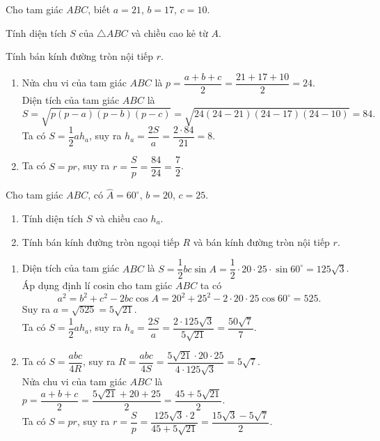 \begin{vd}%
	Cho tam giác $ABC$, biết $a=21$, $b=17$, $c=10$.
	\begin{listEX}[1]
		\item Tính diện tích $S$ của $\triangle ABC$ và chiều cao kẻ từ $A$.
		\item Tính bán kính đường tròn nội tiếp $r$.
	\end{listEX}
	\loigiai
	{
	\begin{enumerate}
		\item Nửa chu vi của tam giác $ABC$ là $p=\dfrac{a+b+c}{2} = \dfrac{21+17+10}{2} = 24$.\\
		Diện tích của tam giác $ABC$ là
		\[S=\sqrt{p(p-a)(p-b)(p-c)} = \sqrt{24(24-21)(24-17)(24-10)} = 84.\]
		Ta có $S=\dfrac{1}{2}ah_a$, suy ra $h_a=\dfrac{2S}{a} = \dfrac{2\cdot 84}{21}=8$.
		\item Ta có $S=pr$, suy ra $r=\dfrac{S}{p} = \dfrac{84}{24}=\dfrac{7}{2}$.
	\end{enumerate}
	}
\end{vd}
\begin{vd}%
	Cho tam giác $ABC$, có $\widehat{A}=60^\circ$, $b=20$, $c=25$.
	\begin{enumerate}
		\item Tính diện tích $S$ và chiều cao $h_a$.
		\item Tính bán kính đường tròn ngoại tiếp $R$ và bán kính đường tròn nội tiếp $r$.
	\end{enumerate}
	\loigiai
	{
	\begin{enumerate}
		\item Diện tích của tam giác $ABC$ là $S=\dfrac{1}{2}bc\sin A = \dfrac{1}{2}\cdot 20\cdot 25\cdot \sin 60^\circ = 125\sqrt{3}$.\\
		Áp dụng định lí cosin cho tam giác $ABC$ ta có
		\[a^2=b^2+c^2-2bc\cos A = 20^2+25^2-2\cdot 20\cdot 25\cos 60^\circ = 525.\]
		Suy ra $a=\sqrt{525}=5\sqrt{21}$.\\
		Ta có $S=\dfrac{1}{2}ah_a$, suy ra $h_a=\dfrac{2S}{a} = \dfrac{2\cdot 125\sqrt{3}}{5\sqrt{21}} = \dfrac{50\sqrt{7}}{7}$.
		\item Ta có $S=\dfrac{abc}{4R}$, suy ra $R=\dfrac{abc}{4S} = \dfrac{5\sqrt{21}\cdot 20\cdot 25}{4\cdot 125\sqrt{3}} = 5\sqrt{7}$.\\
		Nửa chu vi của tam giác $ABC$ là $p=\dfrac{a+b+c}{2} = \dfrac{5\sqrt{21}+20+25}{2} = \dfrac{45+5\sqrt{21}}{2}$.\\
		Ta có $S=pr$, suy ra $r=\dfrac{S}{p} = \dfrac{125\sqrt{3}\cdot 2}{45+5\sqrt{21}} = \dfrac{15\sqrt{3}-5\sqrt{7}}{2}$.
	\end{enumerate}
	}
\end{vd}
